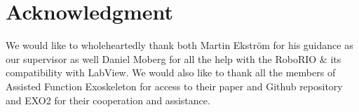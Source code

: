 \section*{Acknowledgment}

We would like to wholeheartedly thank both Martin Ekström for his guidance as our supervisor as well Daniel Moberg for all the help with
the RoboRIO \& its compatibility with LabView. We would also like to thank all the members of Assisted Function Exoskeleton for 
access to their paper and Github repository and EXO2 for their cooperation and assistance.